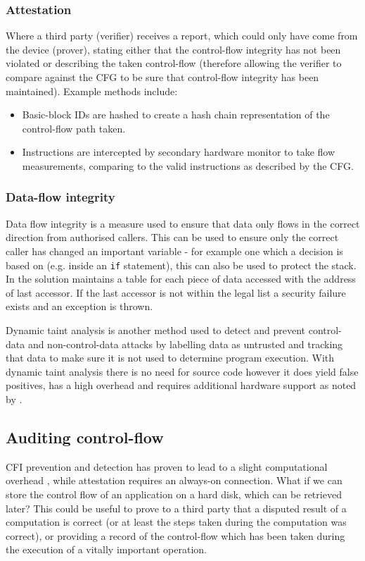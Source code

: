 \subsubsection{Attestation}
Where a third party (verifier) receives a report, which could only have come from the device (prover), stating either that the control-flow integrity has not been violated or describing the taken control-flow (therefore allowing the verifier to compare against the CFG to be sure that control-flow integrity has been maintained). Example methods include:
\begin{itemize}
	\item Basic-block IDs are hashed to create a hash chain representation of the control-flow path taken.
	\item Instructions are intercepted by secondary hardware monitor to take flow measurements, comparing to the valid instructions as described by the CFG.
\end{itemize}

\subsubsection{Data-flow integrity}

Data flow integrity \cite{Castro2006} is a measure used to ensure that data only flows in the correct direction from authorised callers. This can be used to ensure only the correct caller has changed an important variable - for example one which a decision is based on (e.g. inside an \verb|if| statement), this can also be used to protect the stack.
In  \cite{Castro2006} the solution maintains a table for each piece of data accessed with the address of last accessor. If the last accessor is not within the legal list a security failure exists and an exception is thrown.

Dynamic taint analysis \cite{Davi2009} is another method used to detect and prevent control-data and non-control-data attacks by labelling data as untrusted and tracking that data to make sure it is not used to determine program execution. With dynamic taint analysis there is no need for source code however it does yield false positives, has a high overhead and requires additional hardware support as noted by \cite{Castro2006}.

\subsection{Auditing control-flow}
CFI prevention and detection has proven to lead to a slight computational overhead \cite{DeClercq2017}, while attestation requires an always-on connection. What if we can store the control flow of an application on a hard disk, which can be retrieved later? This could be useful to prove to a third party that a disputed result of a computation is correct (or at least the steps taken during the computation was correct), or providing a record of the control-flow which has been taken during the execution of a  vitally important operation.

